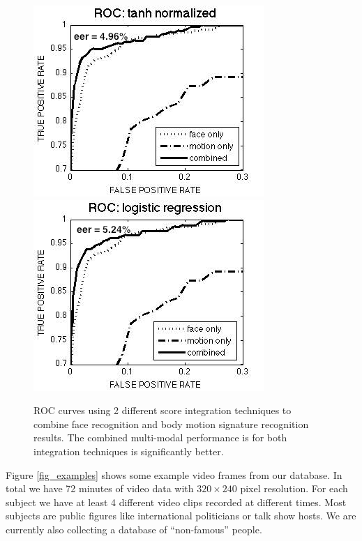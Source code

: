 \documentclass[times, 10pt,twocolumn]{article}
\begin{document}
\begin{figure}[bt]
\centering
\includegraphics[width=0.96\columnwidth]{roc_tan_normalized2}
\includegraphics[width=0.96\columnwidth]{roc_logreg2}
\caption{\label{fig_results} \small ROC curves using 2 different score integration techniques to combine face recognition and body motion signature recognition results. The combined multi-modal performance is for both integration techniques is significantly better.}
\end{figure}
      
Figure \ref{fig_examples}  shows some example video frames from our database.  In total we have 72 minutes of video data with $320 \times 240$ pixel resolution. For each subject we have at least 4 different video clips recorded at different times.   Most subjects are public figures like international politicians or talk show hosts.  We are currently also collecting a database of ``non-famous'' people.
\end{document}
